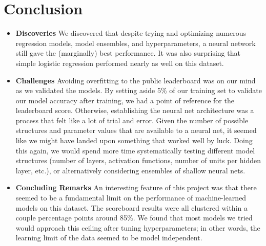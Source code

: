 \section{Conclusion}
\medskip
\begin{itemize}
  
\item \textbf{Discoveries} 
  We discovered that despite trying and optimizing numerous regression models, model ensembles, and hyperparameters, a neural network still gave the (marginally) best performance. It was also surprising that simple logistic regression performed nearly as well on this dataset. 
  
\item \textbf{Challenges} 
  Avoiding overfitting to the public leaderboard was on our mind as we validated the models. By setting aside 5\% of our training set to validate our model accuracy after training, we had a point of reference for the leaderboard score. Otherwise, establishing the neural net architecture was a process that felt like a lot of trial and error. Given the number of possible structures and parameter values that are available to a neural net, it seemed like we might have landed upon something that worked well by luck. Doing this again, we would spend more time systematically testing different model structures (number of layers, activation functions, number of units per hidden layer, etc.), or alternatively considering ensembles of shallow neural nets. 
  
\item \textbf{Concluding Remarks} 
  An interesting feature of this project was that there seemed to be a fundamental limit on the performance of machine-learned models on this dataset. The scoreboard results were all clustered within a couple percentage points around 85\%. We found that most models we tried would approach this ceiling after tuning hyperparameters; in other words, the learning limit of the data seemed to be model independent. 
  
\end{itemize}






\medskip

